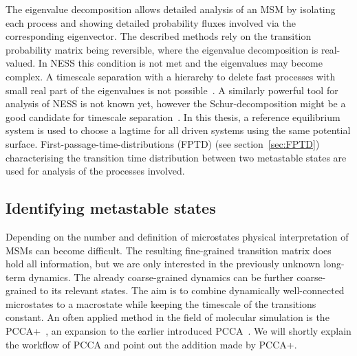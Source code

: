The eigenvalue decomposition allows detailed analysis of an MSM by isolating each process and showing detailed probability fluxes involved via the corresponding eigenvector.
The described methods rely on the transition probability matrix being reversible, where the eigenvalue decomposition is real-valued. In NESS this condition is not met and the eigenvalues may become
complex. A timescale separation with a hierarchy to delete fast processes with small real part of the eigenvalues is not possible~\cite{weber2017eigenvalues}. A similarly powerful tool
for analysis of NESS is not known yet, however the Schur-decomposition might be a good candidate for timescale separation~\cite{weber2015g}.
In this thesis, a reference equilibrium system is used to choose a lagtime for all driven systems using the same potential surface. First-passage-time-distributions (FPTD) (see section~\ref{sec:FPTD}) characterising the transition time distribution between two metastable states are used for analysis of the processes involved. 

\subsection{Identifying metastable states}
\label{sec:PCCA}
Depending on the number and definition of microstates physical interpretation of MSMs can become difficult. The resulting fine-grained transition matrix does hold all information, but we are only interested in the previously unknown long-term dynamics. The already coarse-grained dynamics can be further coarse-grained to its relevant states. The aim is to combine dynamically well-connected microstates to a macrostate while keeping the timescale of the transitions constant. An often applied method in the field of molecular simulation is the PCCA+~\cite{deuflhard2005robust}, an expansion to the earlier introduced PCCA~\cite{deuflhard1998identification}. We will shortly explain the workflow of PCCA and point out the addition made by PCCA+. 

